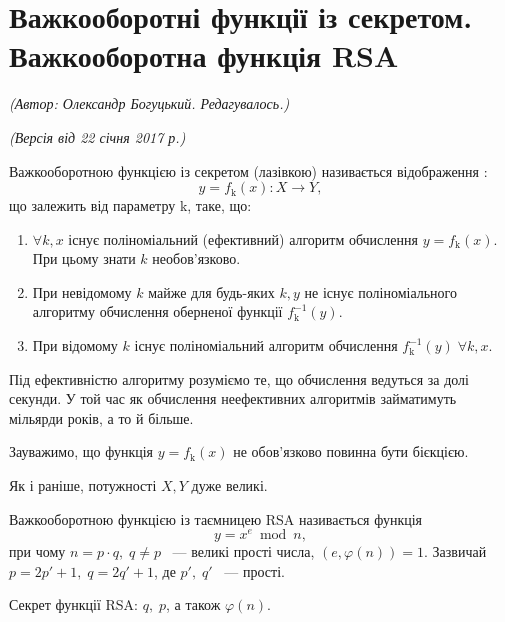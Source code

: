 \section{Важкооборотні функції із секретом. Важкооборотна функція RSA}
\begin{flushright}
\emph{(Автор: Олександр Богуцький.  Редагувалось.)}
\par \emph{(Версія від 22 січня 2017 р.)}
\end{flushright}

\begin{mydef}
 Важкооборотною функцією із секретом (лазівкою) називається відображення :
\begin{equation}
y = f_{\text{k}}(x): X \rightarrow Y,
\end{equation}
що залежить від параметру k, таке, що:
\begin{enumerate}

\item $\forall k, x$ існує поліноміальний (ефективний) алгоритм обчислення $y = f_{\text{k}}(x)$. При цьому знати $k$ необов'язково.

\item При невідомому $k$ майже для будь-яких $k, y$ не існує поліноміального алгоритму обчислення оберненої функції $f_{\text{k}} ^{-1} (y)$.

\item При відомому $k$ існує поліноміальний алгоритм обчислення $f_{\text{k}} ^{-1} (y) \; \forall k, x$.
\end{enumerate}

Під ефективністю алгоритму розуміємо те, що обчислення ведуться за долі секунди. У той час як обчислення неефективних алгоритмів займатимуть мільярди років, а то й більше. 
\end{mydef}

Зауважимо, що функція $y = f_{\text{k}}(x)$ не обов'язково повинна бути бієкцією.

Як і раніше, потужності $X, Y$ дуже великі.

\begin{mydef}
 Важкооборотною функцією із таємницею RSA називається функція 
\begin{equation} \label{eq:3.1} 
y = x ^{e} \bmod n,
\end{equation}
при чому $n = p \cdot q,\; q \neq p$ ~--- великі прості числа, $(e, \varphi(n)) = 1     $. Зазвичай $p = 2p\prime + 1,\; q = 2q\prime + 1$, де $p\prime,\; q\prime$ ~--- прості.
\end{mydef}
Секрет функції RSA: $q, \; p$, а також $\varphi  (n)$.

